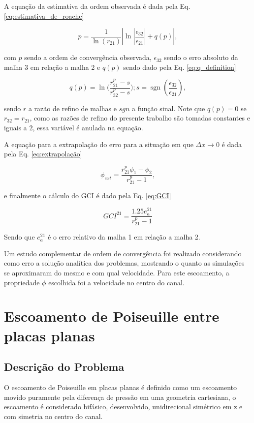 A equação da estimativa da ordem observada é dada pela Eq. \ref{eq:estimativa_de_roache}

\begin{equation}
    p = \frac{1}{\ln(r_{21})}\left|\ln\left|\frac{\epsilon_{32}}{\epsilon_{21}}\right| + q(p)\right|,
    \label{eq:estimativa_de_roache}
\end{equation}

com $p$ sendo a ordem de convergência observada, $\epsilon_{32}$ sendo o erro absoluto da malha 3 em relação a malha 2 e $q(p)$ sendo dado pela Eq. \ref{eq:q_definition}

\begin{equation}
    q(p) = \ln\big(\frac{r^p_{21} - s}{r^p_{32} - s}\big); s = \operatorname{sgn}(\frac{\epsilon_{32}}{\epsilon_{21}}),
    \label{eq:q_definition}
\end{equation}


sendo $r$ a razão de refino de malhas e $sgn$ a função sinal. Note que $q(p) = 0$ se $r_{32} = r_{21}$, como as razões de refino do presente trabalho são tomadas constantes e iguais a 2, essa variável é anulada na equação.

A equação para a extrapolação do erro para a situação em que $\Delta x \to 0$ é dada pela Eq. \ref{eq:extrapolação}

\begin{equation}
    \phi_{ext} = \frac{r^p_{21}\phi_1 - \phi_2}{r^p_{21} - 1},
    \label{eq:extrapolação}
\end{equation}

e finalmente o cálculo do GCI é dado pela Eq. \ref{eq:GCI}

\begin{equation}
    GCI^{21} = \frac{1.25e_a^{21}}{r^p_{21} -1}
    \label{eq:GCI}
\end{equation}

Sendo que $e_a^{21}$ é o erro relativo da malha 1 em relação a malha 2.

Um estudo complementar de ordem de convergência foi realizado considerando como erro a solução analítica dos problemas, mostrando o quanto as simulações se aproximaram do mesmo e com qual velocidade. Para este escoamento, a propriedade $\phi$ escolhida foi a velocidade no centro do canal.

\section{Escoamento de Poiseuille entre placas planas}
\subsection{Descrição do Problema}
O escoamento de Poiseuille em placas planas é definido como um escoamento movido puramente pela diferença de pressão em uma geometria cartesiana, o escoamento é considerado bifásico, desenvolvido, unidirecional simétrico em z e com simetria no centro do canal.

